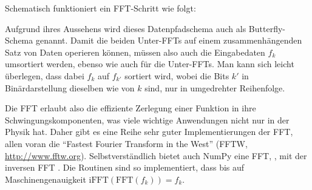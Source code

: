 Schematisch funktioniert ein FFT-Schritt wie folgt:
\begin{center}
\end{center}
Aufgrund ihres Aussehens wird dieses Datenpfadschema auch als
Butterfly-Schema genannt. Damit die beiden Unter-FFTs auf einem
zusammenhängenden Satz von Daten operieren können, müssen also auch
die Eingabedaten $f_k$ umsortiert werden, ebenso wie auch für die
Unter-FFTs. Man kann sich leicht überlegen, dass dabei $f_k$ auf
$f_{k'}$ sortiert wird, wobei die Bits  $k'$ in Binärdarstellung
dieselben wie von $k$ sind, nur in umgedrehter Reihenfolge.

Die FFT erlaubt also die effiziente Zerlegung einer Funktion in ihre
Schwingungskomponenten, was viele wichtige Anwendungen nicht nur in
der Physik hat. Daher gibt es eine Reihe sehr guter Implementierungen
der FFT, allen voran die "`Fastest Fourier Transform in the West"'
(FFTW, \url{http://www.fftw.org}). Selbstverständlich bietet auch NumPy
eine FFT, , mit der inversen FFT
. Die Routinen sind so implementiert, dass
bis auf Maschinengenauigkeit $\text{iFFT}(\text{FFT}(f_k)) = f_k$.

